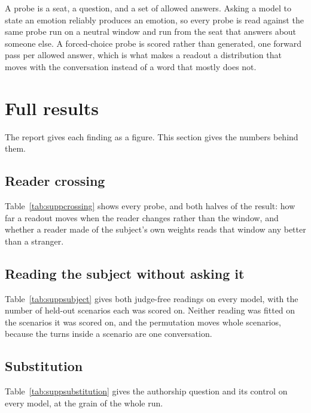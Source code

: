 \documentclass[11pt,letterpaper]{article}
\begin{document}
A probe is a seat, a question, and a set of allowed answers. Asking a model to
state an emotion reliably produces an emotion, so every probe is read against
the same probe run on a neutral window and run from the seat that answers about
someone else. A forced-choice probe is scored rather than generated, one
forward pass per allowed answer, which is what makes a readout a distribution
that moves with the conversation instead of a word that mostly does not.



\section{Full results}
\label{app:results}

The report gives each finding as a figure. This section gives the numbers
behind them.

\subsection{Reader crossing}

Table~\ref{tab:suppcrossing} shows every probe, and both halves of the result:
how far a readout moves when the reader changes rather than the window, and
whether a reader made of the subject's own weights reads that window any better
than a stranger.



\subsection{Reading the subject without asking it}

Table~\ref{tab:suppsubject} gives both judge-free readings on every model, with
the number of held-out scenarios each was scored on. Neither reading was fitted
on the scenarios it was scored on, and the permutation moves whole scenarios,
because the turns inside a scenario are one conversation.




\subsection{Substitution}

Table~\ref{tab:suppsubstitution} gives the authorship question and its control
on every model, at the grain of the whole run.
\end{document}
